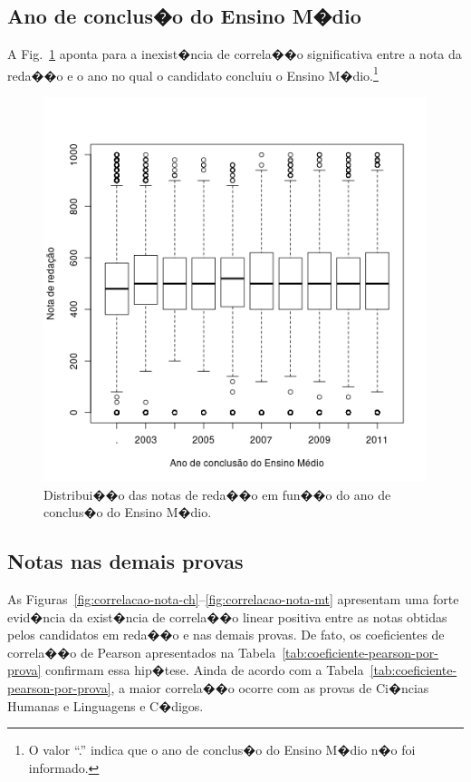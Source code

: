 \documentclass[12pt]{article}
\newcommand{\reffig}[1]{Fig.~\ref{fig:#1}}
\newcommand{\reftab}[1]{Tabela~\ref{tab:#1}}
\begin{document}
\subsection{Ano de conclus�o do Ensino M�dio}
A \reffig{correlacao-ano-concluiu} aponta para a inexist�ncia de correla��o significativa entre a nota da reda��o e o ano no qual o candidato concluiu o Ensino M�dio.\footnote{O valor ``.'' indica que o ano de conclus�o do Ensino M�dio n�o foi informado.}
\begin{figure}[H]
\centering\includegraphics[width=.45\linewidth]{../correlacao_ano_concluiu.png}
\caption{Distribui��o das notas de reda��o em fun��o do ano de conclus�o do Ensino M�dio.}
\label{fig:correlacao-ano-concluiu}
\end{figure}

\subsection{Notas nas demais provas}
As Figuras~\ref{fig:correlacao-nota-ch}--\ref{fig:correlacao-nota-mt} apresentam uma forte evid�ncia da exist�ncia de correla��o linear positiva entre as notas obtidas pelos candidatos em reda��o e nas demais provas.
De fato, os coeficientes de correla��o de Pearson apresentados na \reftab{coeficiente-pearson-por-prova} confirmam essa hip�tese.
Ainda de acordo com a \reftab{coeficiente-pearson-por-prova}, a maior correla��o ocorre com as provas de Ci�ncias Humanas e Linguagens e C�digos.
\end{document}
